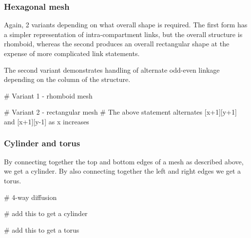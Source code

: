 \subsubsection{Hexagonal mesh}

Again, 2 variants depending on what overall shape is required. The first form has a simpler representation of intra-compartment links, but the overall structure is rhomboid, whereas the second produces an overall rectangular shape at the expense of more complicated link statements.

The second variant demonstrates handling of alternate odd-even linkage depending on the column of the structure.

\begin{kappasource}

# Variant 1 - rhomboid mesh

# Variant 2 - rectangular mesh
# The above statement alternates [x+1][y+1] and [x+1][y-1] as x increases
\end{kappasource}


\subsubsection{Cylinder and torus}

By connecting together the top and bottom edges of a mesh as described above, we get a cylinder. By also connecting together the left and right edges we get a torus.

\begin{kappasource}

# 4-way diffusion

# add this to get a cylinder

# add this to get a torus
\end{kappasource}

